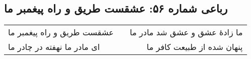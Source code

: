 \begin{center}
\section*{رباعی شماره ۵۶: عشقست طریق و راه پیغمبر ما}
\label{sec:0056}
\begin{longtable}{l p{0.5cm} r}
عشقست طریق و راه پیغمبر ما
&&
ما زادهٔ عشق و عشق شد مادر ما
\\
ای مادر ما نهفته در چادر ما
&&
پنهان شده از طبیعت کافر ما
\\
\end{longtable}
\end{center}
